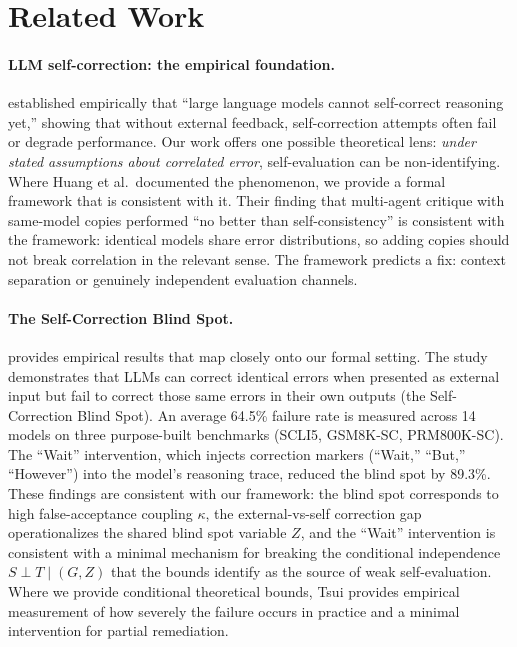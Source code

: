 \documentclass[11pt]{article}
\begin{document}
\section{Related Work}

\paragraph{LLM self-correction: the empirical foundation.} \citet{huang2024selfcorrect} established empirically that ``large language models cannot self-correct reasoning yet,'' showing that without external feedback, self-correction attempts often fail or degrade performance. Our work offers one possible theoretical lens: \emph{under stated assumptions about correlated error}, self-evaluation can be non-identifying. Where Huang et al.\ documented the phenomenon, we provide a formal framework that is consistent with it. Their finding that multi-agent critique with same-model copies performed ``no better than self-consistency'' is consistent with the framework: identical models share error distributions, so adding copies should not break correlation in the relevant sense. The framework predicts a fix: context separation or genuinely independent evaluation channels.

\paragraph{The Self-Correction Blind Spot.} \citet{tsui2025selfcorrection} provides empirical results that map closely onto our formal setting. The study demonstrates that LLMs can correct identical errors when presented as external input but fail to correct those same errors in their own outputs (the Self-Correction Blind Spot). An average 64.5\% failure rate is measured across 14 models on three purpose-built benchmarks (SCLI5, GSM8K-SC, PRM800K-SC). The ``Wait'' intervention, which injects correction markers (``Wait,'' ``But,'' ``However'') into the model's reasoning trace, reduced the blind spot by 89.3\%. These findings are consistent with our framework: the blind spot corresponds to high false-acceptance coupling $\kappa$, the external-vs-self correction gap operationalizes the shared blind spot variable $Z$, and the ``Wait'' intervention is consistent with a minimal mechanism for breaking the conditional independence $S \perp T \mid (G, Z)$ that the bounds identify as the source of weak self-evaluation. Where we provide conditional theoretical bounds, Tsui provides empirical measurement of how severely the failure occurs in practice and a minimal intervention for partial remediation.
\end{document}
